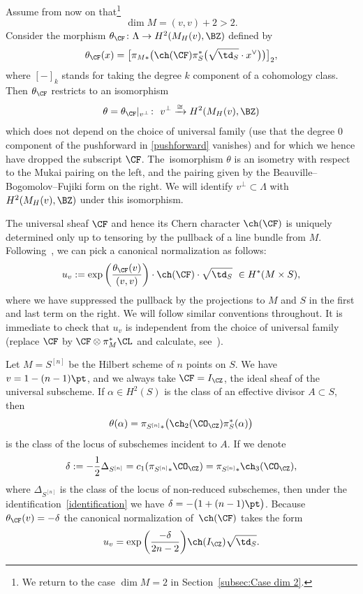 Assume from now on that\footnote{We return to the case $\dim M = 2$ in Section~\ref{subsec:Case dim 2}.}
\[
\dim M = (v,v) + 2 > 2.
\]
Consider the morphism $\theta_{\CF} \colon \Lambda \to H^2(M_H(v),\BZ)$ defined by
\begin{equation}
\theta_{\CF}(x) = \big[ \pi_{M \ast}\big( \ch(\CF)
\pi_S^{\ast}\big( \sqrt{\td_S} \cdot x^{\vee}  \big) \big) \big]_{2},
\label{pushforward} \end{equation}
where $[ - ]_{k}$ stands for taking the degree $k$ component of a cohomology class.
Then $\theta_{\CF}$ restricts to an isomorphism
\begin{equation}
\theta = \theta_{\CF}|_{v^{\perp}} \colon \ v^{\perp} \xrightarrow{\cong} H^2(M_H(v),\BZ) \label{identification}
\end{equation}
which does not depend on the choice of universal family (use that the degree $0$ component of the pushforward in \eqref{pushforward} vanishes)
and for which we hence have dropped the subscript $\CF$.
The~isomorphism $\theta$ is an isometry with respect to the Mukai pairing on the left, and the pairing given by the Beauville--Bogomolov--Fujiki form on the right.
We will identify $v^{\perp} \subset \Lambda$ with $H^2(M_{H}(v),\BZ)$ under this isomorphism.

The universal sheaf $\CF$ and hence its Chern character $\ch(\CF)$ is uniquely determined only up to tensoring by the pullback of a line bundle from $M$.
Following~\cite{Markman}, we can pick a canonical normalization as follows:
\[
u_v := \exp\bigg( \frac{\theta_{\CF}(v) }{(v,v)} \bigg) \cdot \ch(\CF) \cdot \sqrt{\td_S} \ \in H^{\ast}(M \times S),
\]
where we have suppressed the pullback by the projections to $M$ and $S$ in the first and last term on the right.
We will follow similar conventions throughout.
It is immediate to check that $u_v$ is independent from the choice of universal family (replace $\CF$ by $\CF \otimes \pi_M^{\ast} \CL$ and calculate, see~\cite[Lemma~3.1]{Markman}).


\begin{Example} %
Let $M = S^{[n]}$ be the Hilbert scheme of $n$ points on $S$. We have $v=1-(n-1) \pt$,
and we always take $\CF = I_{\CZ}$, the ideal sheaf of the universal subscheme.
If $\alpha \in H^2(S)$ is the class of an effective divisor $A \subset S$, then
\[
\theta(\alpha) = \pi_{S^{[n]} \ast}\big(\ch_2(\CO_{\CZ}) \pi_S^{\ast}(\alpha)\big)
\]
is the class of the locus of subschemes incident to $A$.
If we denote
\[
\delta := -\frac{1}{2} \Delta_{S^{[n]}} = c_1( \pi_{S^{[n]} \ast} \CO_{\CZ} ) = \pi_{S^{[n]} \ast} \ch_3(\CO_{\CZ}),
\]
where $\Delta_{S^{[n]}}$ is the class of the locus of non-reduced subschemes, then
under the identification~\eqref{identification} we have
$\delta = - \big( 1 + (n-1) \pt \big)$.
Because $\theta_{\CF}(v)=-\delta$ the canonical normalization of~$\ch(\CF)$ takes the form
\[
u_v = \exp\bigg( \frac{-\delta}{2n-2} \bigg) \ch(I_{\CZ}) \sqrt{\td_S}.
\]
\end{Example}

